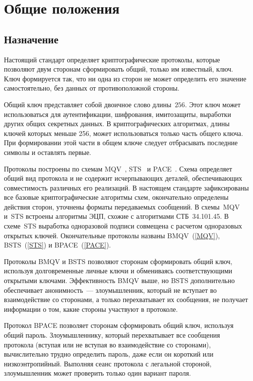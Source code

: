 \chapter{Общие положения}\label{COMMON}

\section{Назначение}\label{COMMON.Dest}

Настоящий стандарт определяет криптографические протоколы,
которые позволяют двум сторонам сформировать общий,
только им известный, ключ.                      
%
Ключ формируется так, что ни одна из сторон
не может определить его значение самостоятельно, 
без данных от противоположной стороны.

Общий ключ представляет собой двоичное слово длины~$256$.
%
Этот ключ может использоваться для аутентификации, 
шифрования, имитозащиты, выработки других общих секретных данных.
%
В криптографических алгоритмах, длины ключей которых меньше 256, 
может использоваться только часть общего ключа. При формировании этой 
части в общем ключе следует отбрасывать последние символы и оставлять 
первые.

Протоколы построены по схемам MQV~\cite{MQV}, 
STS~\cite{STS} и PACE~\cite{PACE}.
%
Схема определяет общий вид протокола и не содержит исчерпывающих деталей,
обеспечивающих совместимость различных его реализаций.
%
В настоящем стандарте
зафиксированы все базовые криптографические алгоритмы схем, 
окончательно определены действия сторон,
уточнены форматы передаваемых сообщений.
В схемы~MQV и~STS встроены алгоритмы ЭЦП, 
схожие с алгоритмами СТБ~34.101.45.
%
В схеме~STS выработка одноразовой подписи
совмещена с расчетом одноразовых открытых ключей.
%
Окончательные протоколы названы BMQV~(\ref{MQV}), 
BSTS~(\ref{STS}) и BPACE~(\ref{PACE}).

Протоколы BMQV и BSTS
позволяют сторонам сформировать общий ключ, 
используя долговременные личные ключи и обмениваясь 
соответствующими открытыми ключами.
%
Эффективность BMQV выше, но BSTS дополнительно
обеспечивает анонимность~---
злоумышленник, который не вступает во взаимодействие со сторонами, 
а только перехватывает их сообщения,
не получает информации о том, какие стороны 
участвуют в протоколе.

Протокол BPACE позволяет сторонам сформировать общий ключ, 
используя общий пароль.
%
Злоумышленнику, который перехватывает все сообщения протокола 
(вступая или не вступая во взаимодействие со сторонами),
вычислительно трудно определить пароль, 
даже если он короткий или низкоэнтропийный.
%
Выполняя сеанс протокола с легальной стороной, 
злоумышленник может проверить только один вариант пароля.

